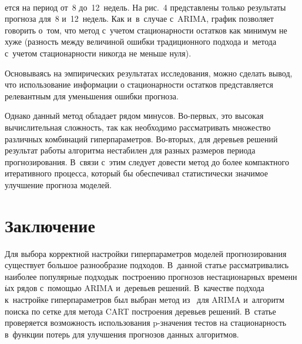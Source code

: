 \begin{figure*} %
\vspace*{9pt}
  \begin{center}  
    \mbox{%
\epsfxsize=103.065mm
}

\end{center}
\vspace*{-9pt}
    \label{pic4}
\end{figure*}

\begin{multicols}{2}

\noindent
ется
 на период от~8 до~12~недель. На рис.~4 пред\-став\-ле\-ны только результаты прогноза для~8 и~12~недель.
  Как и~в~случае с~\mbox{ARIMA}, график позволяет говорить о~том, 
что метод с~учетом стационарности остатков как минимум не хуже  (разность между величиной 
ошибки традиционного подхода и~метода с~учетом стационарности никогда не меньше нуля).



Основываясь на эмпирических результатах исследования, 
мож\-но сделать вывод, что использование информации о стационарности остатков
 представляется релевантным для уменьшения ошибки прогноза.

Однако данный метод обладает рядом минусов. Во-пер\-вых, это высокая вычислительная слож\-ность, 
так как необходимо рассматривать множество различных комбинаций гиперпараметров. Во-вто\-рых, 
для деревьев решений результат работы алгоритма нестабилен для разных размеров периода 
прогнозирования. В~связи с~этим следует довести метод до более компактного итеративного процесса, 
который бы обеспечивал статистически значимое улучшение прогноза моделей.


\section{Заключение}

Для выбора корректной настройки гиперпараметров моделей прогнозирования 
существует большое разнообразие подходов. В~данной статье рассматривались наиболее популярные 
подходы\linebreak к~построению прогнозов нестационарных вре\-мен\-н$\acute{\mbox{ы}}$х рядов с~по\-мощью \mbox{ARIMA} и~деревьев решений. 
В~качестве подхода к~настройке гиперпараметров был выбран метод из~\cite{17-kr} 
для ARIMA и~алгоритм поиска по сетке для метода CART построения деревьев решений. 
В~статье проверяется возможность использования p-зна\-че\-ния тестов на стационарность в~функции 
потерь для улучшения прогнозов данных алгоритмов.


\end{multicols}

